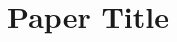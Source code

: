 \documentclass[cameraready]{template/mac_automl_xmu_blue}
\title{Paper Title}
\begin{document}
\maketitle







\clearpage



\clearpage
\beginappendix

\end{document}
